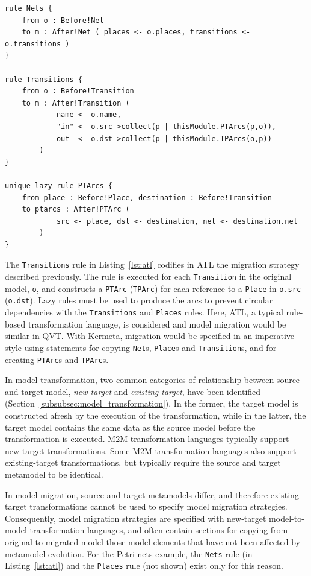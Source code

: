 \begin{lstlisting}[float=tbp, caption={[Part of the Petri nets migration in ATL]Part of the Petri nets migration in ATL, from \cite{rose10flock}}, label=lst:atl, language=ATL]
rule Nets {
	from o : Before!Net
	to m : After!Net ( places <- o.places, transitions <- o.transitions )
}

rule Transitions {
	from o : Before!Transition
	to m : After!Transition (
			name <- o.name,
			"in" <- o.src->collect(p | thisModule.PTArcs(p,o)),
			out  <- o.dst->collect(p | thisModule.TPArcs(o,p))
		)
}

unique lazy rule PTArcs {
	from place : Before!Place, destination : Before!Transition
	to ptarcs : After!PTArc (
			src <- place, dst <- destination, net <- destination.net
		)
}
\end{lstlisting}

The \texttt{Transitions} rule in Listing~\ref{lst:atl} codifies in ATL the migration strategy described previously. The rule is executed for each \texttt{Transition} in the original model, \texttt{o}, and constructs a \texttt{PTArc} (\texttt{TPArc}) for each reference to a \texttt{Place} in \texttt{o.src} (\texttt{o.dst}). Lazy rules must be used to produce the arcs to prevent circular dependencies with the \texttt{Transitions} and \texttt{Places} rules. Here, ATL, a typical rule-based transformation language, is considered and model migration would be similar in QVT. With Kermeta, migration would be specified in an imperative style using statements for copying \texttt{Net}s, \texttt{Place}s and \texttt{Transition}s, and for creating \texttt{PTArc}s and \texttt{TPArc}s.

In \cc model transformation, two common categories of relationship between source and target model, \emph{new-target} and \emph{existing-target}, have been identified (Section~\ref{subsubsec:model_transformation}). In the former, the target model is constructed afresh by the execution of the transformation, while in the latter, the target model contains the same data as the source model before the transformation is executed. M2M transformation languages typically support new-target transformations. Some M2M transformation languages also support existing-target transformations, but typically require the source and target metamodel to be identical.

In model migration, source and target metamodels differ, and therefore existing-target transformations cannot be used to specify model migration strategies. Consequently, model migration strategies are specified with new-target model-to-model transformation languages, and often contain sections for copying from original to migrated model those model elements that have not been affected by metamodel evolution. For the Petri nets example, the \texttt{Nets} rule (in Listing~\ref{lst:atl}) and the \texttt{Places} rule (not shown) exist only for this reason.


